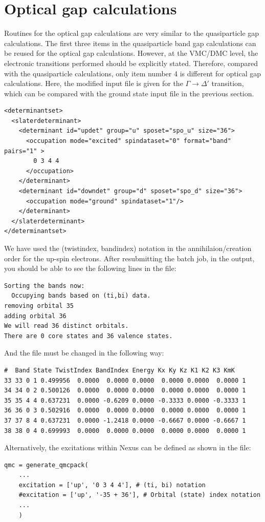 \section{Optical gap calculations}
Routines for the optical gap calculations are very similar to the quasiparticle gap calculations. 
The first three items in the quasiparticle band gap calculations can be reused for the optical gap calculations. 
However, at the VMC/DMC level, the electronic transitions performed should be explicitly stated. 
Therefore, compared with the quasiparticle calculations, only item number 4 is different for optical gap calculations. 
Here, the modified input file is given for the $\Gamma\rightarrow\Delta'$ transition, which can be compared with the ground state input file in the previous section. 
\begin{lstlisting}[style=QMCPXML]
<determinantset>
  <slaterdeterminant>
    <determinant id="updet" group="u" sposet="spo_u" size="36">
      <occupation mode="excited" spindataset="0" format="band" pairs="1" >
        0 3 4 4
      </occupation>
    </determinant>
    <determinant id="downdet" group="d" sposet="spo_d" size="36">
      <occupation mode="ground" spindataset="1"/>	
    </determinant>
  </slaterdeterminant>
</determinantset>
\end{lstlisting}
We have used the (twistindex, bandindex) notation in the annihilaion/creation order for the up-spin electrons.
After resubmitting the batch job, in the output, you should be able to see the following lines in the  file:
\begin{lstlisting}[style=SHELL]
Sorting the bands now:
  Occupying bands based on (ti,bi) data.
removing orbital 35
adding orbital 36
We will read 36 distinct orbitals.
There are 0 core states and 36 valence states.
\end{lstlisting}
And the  file must be changed in the following way: 
\begin{lstlisting}[style=SHELL]
#  Band State TwistIndex BandIndex Energy Kx Ky Kz K1 K2 K3 KmK
33 33 0	1 0.499956	0.0000  0.0000 0.0000  0.0000 0.0000  0.0000 1
34 34 0	2 0.500126	0.0000  0.0000 0.0000  0.0000 0.0000  0.0000 1
35 35 4	4 0.637231	0.0000 -0.6209 0.0000 -0.3333 0.0000 -0.3333 1
36 36 0	3 0.502916	0.0000  0.0000 0.0000  0.0000 0.0000  0.0000 1
37 37 8	4 0.637231	0.0000 -1.2418 0.0000 -0.6667 0.0000 -0.6667 1
38 38 0	4 0.699993	0.0000  0.0000 0.0000  0.0000 0.0000  0.0000 1
\end{lstlisting}
Alternatively, the excitations within Nexus can be defined as shown in the  file:
\begin{lstlisting}[style=Python]
qmc = generate_qmcpack(
    ...
    excitation = ['up', '0 3 4 4'], # (ti, bi) notation
    #excitation = ['up', '-35 + 36'], # Orbital (state) index notation
    ...
    )
\end{lstlisting}

